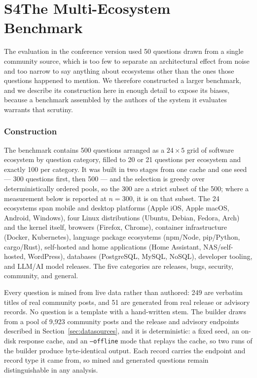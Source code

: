 \documentclass[acmsmall,anonymous,screen]{acmart}
\begin{document}
\section*{S4\quad The Multi-Ecosystem Benchmark}

The evaluation in the conference version used 50 questions drawn from a single
community source, which is too few to separate an architectural effect from
noise and too narrow to say anything about ecosystems other than the ones those
questions happened to mention. We therefore constructed a larger benchmark, and
we describe its construction here in enough detail to expose its biases, because
a benchmark assembled by the authors of the system it evaluates warrants that
scrutiny.

\subsubsection{Construction}

The benchmark contains 500 questions arranged as a $24 \times 5$ grid of
software ecosystem by question category, filled to 20 or 21 questions per
ecosystem and exactly 100 per category. It was built in two stages from one
cache and one seed --- 300 questions first, then 500 --- and the selection is
greedy over deterministically ordered pools, so the 300 are a strict subset of
the 500; where a measurement below is reported at $n=300$, it is on that
subset. The 24 ecosystems span mobile and desktop
platforms (Apple iOS, Apple macOS, Android, Windows), four Linux distributions
(Ubuntu, Debian, Fedora, Arch) and the kernel itself, browsers (Firefox,
Chrome), container infrastructure (Docker, Kubernetes), language package
ecosystems (npm/Node, pip/Python, cargo/Rust), self-hosted and home applications
(Home Assistant, NAS/self-hosted, WordPress), databases (PostgreSQL, MySQL,
NoSQL), developer tooling, and LLM/AI model releases. The five categories are
releases, bugs, security, community, and general.

Every question is mined from live data rather than authored: 249 are verbatim
titles of real community posts, and 51 are generated from real release or
advisory records. No question is a template with a hand-written stem. The
builder draws from a pool of 9,923 community posts and the release and advisory
endpoints described in Section~\ref{sec:datasources}, and it is deterministic:
a fixed seed, an on-disk response cache, and an \texttt{--offline} mode that
replays the cache, so two runs of the builder produce byte-identical output.
Each record carries the endpoint and record type it came from, so mined and
generated questions remain distinguishable in any analysis.
\end{document}
